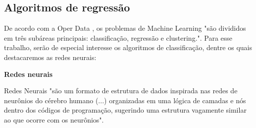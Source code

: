         \subsection{Algoritmos de regressão}
	    De acordo com a Oper Data \cite{oper2020}, os problemas de Machine Learning "são divididos em três subáreas principais: classificação, regressão e clustering.". Para esse trabalho, serão de especial interesse os algoritmos de classificação, dentre os quais destacaremos as redes neurais:\newline





		    \textbf{Redes neurais}\par
		    Redes Neurais "são um formato de estrutura de dados inspirada nas redes de neurônios do cérebro humano (...) organizadas em uma lógica de camadas e nós dentro dos códigos de programação, sugerindo uma estrutura vagamente similar ao que ocorre com os neurônios".\cite{ilumeo2020}

